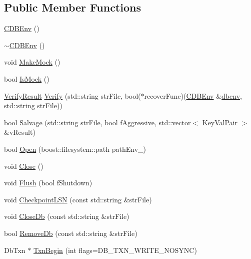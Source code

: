 \subsection*{Public Member Functions}
\begin{DoxyCompactItemize}
\item 
\hyperlink{class_c_d_b_env_a6b24104a8fcc5a9ebfbdfcac725e9bbc}{C\+D\+B\+Env} ()
\item 
\hyperlink{class_c_d_b_env_a217f5a20e4fc0790e495f9fa78ee8708}{$\sim$\+C\+D\+B\+Env} ()
\item 
void \hyperlink{class_c_d_b_env_ab352b9f28a8329037fd942f9912797e3}{Make\+Mock} ()
\item 
bool \hyperlink{class_c_d_b_env_ae44129114301a41635c3707c6bc92ab1}{Is\+Mock} ()
\item 
\hyperlink{class_c_d_b_env_a6fbf26da5d7f8f64a77a3ba15e4df244}{Verify\+Result} \hyperlink{class_c_d_b_env_a9d04604da4ad6f063e150b34d5df392d}{Verify} (std\+::string str\+File, bool($\ast$recover\+Func)(\hyperlink{class_c_d_b_env}{C\+D\+B\+Env} \&\hyperlink{class_c_d_b_env_a50a70690e7f688f5e92a972e7fa18668}{dbenv}, std\+::string str\+File))
\item 
bool \hyperlink{class_c_d_b_env_a08726637bff0809ab9c7c493383a3914}{Salvage} (std\+::string str\+File, bool f\+Aggressive, std\+::vector$<$ \hyperlink{class_c_d_b_env_a53fd285f09c312973caa6f90b33937f5}{Key\+Val\+Pair} $>$ \&v\+Result)
\item 
bool \hyperlink{class_c_d_b_env_a1a81be1585305e5cedd2bccd6c7570c3}{Open} (boost\+::filesystem\+::path path\+Env\+\_\+)
\item 
void \hyperlink{class_c_d_b_env_a0bf3b64c05bf0d7f0a7dbaa9a072c0bc}{Close} ()
\item 
void \hyperlink{class_c_d_b_env_a09c5850b88919553a8db416ce288ff1a}{Flush} (bool f\+Shutdown)
\item 
void \hyperlink{class_c_d_b_env_aa4e0fe52dfc0da22fe9bf59eeda57fba}{Checkpoint\+L\+S\+N} (const std\+::string \&str\+File)
\item 
void \hyperlink{class_c_d_b_env_ac53fd53afdd1e0881b8ffbb11a89b556}{Close\+Db} (const std\+::string \&str\+File)
\item 
bool \hyperlink{class_c_d_b_env_a1a53f94daf3096e047d7b041e6a885d6}{Remove\+Db} (const std\+::string \&str\+File)
\item 
Db\+Txn $\ast$ \hyperlink{class_c_d_b_env_a5f1daab338b2098ea693efad6edefb9b}{Txn\+Begin} (int flags=D\+B\+\_\+\+T\+X\+N\+\_\+\+W\+R\+I\+T\+E\+\_\+\+N\+O\+S\+Y\+N\+C)
\end{DoxyCompactItemize}
